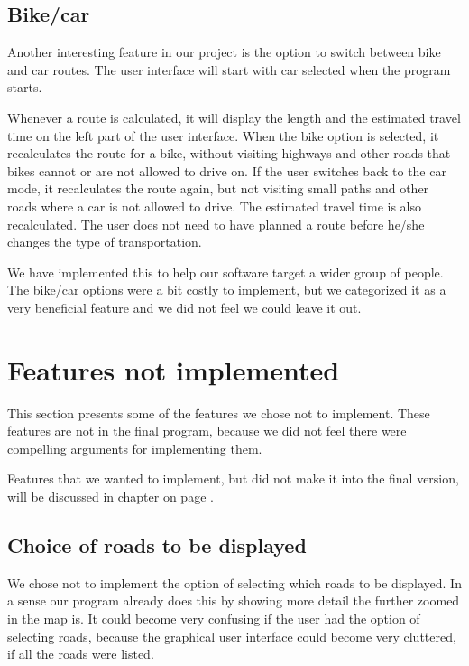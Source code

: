 \subsection{Bike/car}
\label{UIA-IF-BC}
Another interesting feature in our  project is the option
to switch between bike and car routes. The user interface will start with car
selected when the program starts.

Whenever a route is calculated, it will display the length and the estimated
travel time on the left part of the user interface. When the bike option is selected, 
it recalculates the route for a bike, without visiting highways and other roads 
that bikes cannot or are not allowed to drive on. If the user switches back to the 
car mode, it recalculates the route again, but not visiting small paths and other 
roads where a car is not allowed to drive. The estimated travel time is also 
recalculated. The user does not need to have planned a route before he/she 
changes the type of transportation.

We have implemented this to help our software target a wider group of people.
The bike/car options were a bit costly to implement, but we categorized it as a
very beneficial feature and we did not feel we could leave it out.

\section{Features not implemented}
\label{UIA-NI}
This section presents some of the features we chose not to implement.
These features are not in the final program, because we did not feel there were
compelling arguments for implementing them.

Features that we wanted to implement, but did not make it into the final version,
will be discussed in chapter  on page \pageref{PRC}.

\subsection{Choice of roads to be displayed}
\label{UIA-NI-CRD}
We chose not to implement the option of selecting which roads to be displayed.
In a sense our program already does this by showing more detail the further
zoomed in the map is. It could become very confusing if the user had the option
of selecting roads, because the graphical user interface could become very
cluttered, if all the roads were listed.

